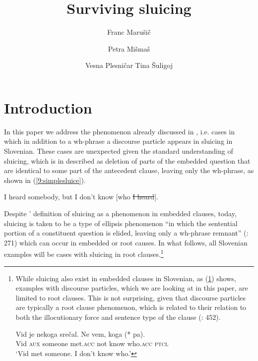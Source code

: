 \documentclass[output=paper,
modfonts,
newtxmath,
hidelinks
]{langscibook}
\title{Surviving sluicing}
\author{
Franc Marušič\affiliation{University of Nova Gorica}\and 
Petra Mišmaš\affiliation{University of Nova Gorica}\and
Vesna Plesničar\affiliation{University of Nova Gorica}\lastand
Tina Šuligoj\affiliation{University of Nova Gorica}
}
\begin{document}
\maketitle
{}

\section{Introduction}\label{9:s1}
In this paper we address the phenomenon already discussed in \cite{marusicetal2015}, i.e. cases in which in addition to a wh-phrase a discourse particle appears in sluicing in Slovenian. These cases are unexpected given the standard understanding of sluicing, which is in \cite{ross1969} described as deletion of parts of the embedded question that are identical to some part of the antecedent clause, leaving only the wh-phrase, as shown in (\ref{9:simplesluice}). 


\ea \label{9:simplesluice}I heard somebody, but I don't know [who \sout{I heard}].
\z
 
\noindent Despite \citeauthor{ross1969}' definition of sluicing as a phenomenon in embedded clauses, today, sluicing is taken to be a type of ellipsis phenomenon ``in which the sentential portion of a constituent question is elided, leaving only a wh-phrase remnant'' (\citealt{merchant2006}: 271) which can occur in embedded or root causes. In what follows, all Slovenian examples will be cases with sluicing in root clauses.\footnote{While sluicing also exist in embedded clauses in Slovenian, as (\ref{9:embeddedpa}) shows, examples with discourse particles, which we are looking at in this paper, are limited to root clauses. This is not surprising, given that discourse particles are typically a root clause phenomenon, which is related to their relation to both the illocutionary force and sentence type of the clause (\citealt{bayerobenauer2011}: 452).

\ea \label{9:embeddedpa}
\gll Vid je nekoga srečal. Ne vem, koga (*\hspace{-2pt} pa).\\
Vid \textsc{aux}  someone met.\textsc{acc}  not know who.\textsc{acc} {} \textsc{ptcl}\\
\glt `Vid met someone. I don't know who.'
\zlast }
\end{document}

